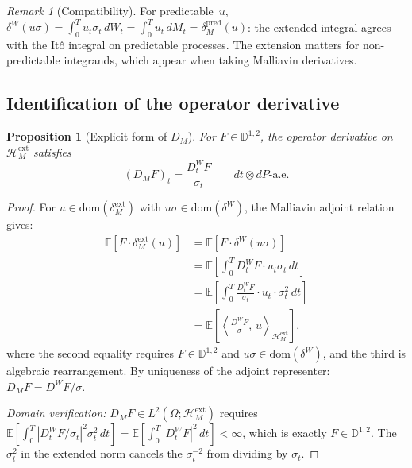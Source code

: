 \documentclass[11pt,a4paper]{article}
\theoremstyle{plain}
\newtheorem{proposition}[theorem]{Proposition}
\theoremstyle{definition}
\theoremstyle{remark}
\newtheorem{remark}[theorem]{Remark}
\newcommand{\E}{\mathbb{E}}
\newcommand{\dom}{\mathrm{dom}}
\newcommand{\HM}{\mathcal{H}_M}
\begin{document}
\begin{remark}[Compatibility]\label{rem:compat}
For predictable~$u$, $\delta^W(u\sigma) = \int_0^T u_t\sigma_t\,dW_t = \int_0^T u_t\,dM_t = \delta_M^{\mathrm{pred}}(u)$: the extended integral agrees with the It\^o integral on predictable processes. The extension matters for non-predictable integrands, which appear when taking Malliavin derivatives.
\end{remark}


\subsection{Identification of the operator derivative}

\begin{proposition}[Explicit form of $D_M$]\label{prop:DM}
For $F \in \mathbb{D}^{1,2}$, the operator derivative on $\HM^{\mathrm{ext}}$ satisfies
\begin{equation}\label{eq:DM}
(D_M F)_t = \frac{D_t^W F}{\sigma_t} \qquad dt \otimes dP\text{-a.e.}
\end{equation}
\end{proposition}

\begin{proof}
For $u \in \dom(\delta_M^{\mathrm{ext}})$ with $u\sigma \in \dom(\delta^W)$, the Malliavin adjoint relation~\cite[Proposition 1.3.1]{Nualart2006} gives:
\begin{align*}
\E[F \cdot \delta_M^{\mathrm{ext}}(u)] &= \E[F \cdot \delta^W(u\sigma)] \\
&= \E\!\left[\int_0^T D_t^W F \cdot u_t \sigma_t\,dt\right] \\
&= \E\!\left[\int_0^T \frac{D_t^W F}{\sigma_t} \cdot u_t \cdot \sigma_t^2\,dt\right] \\
&= \E\!\left[\left\langle \frac{D^W F}{\sigma},\, u \right\rangle_{\HM^{\mathrm{ext}}}\right],
\end{align*}
where the second equality requires $F \in \mathbb{D}^{1,2}$ and $u\sigma \in \dom(\delta^W)$, and the third is algebraic rearrangement. By uniqueness of the adjoint representer: $D_M F = D^W F / \sigma$.

\emph{Domain verification:} $D_M F \in L^2(\Omega; \HM^{\mathrm{ext}})$ requires $\E[\int_0^T |D_t^W F / \sigma_t|^2 \sigma_t^2\,dt] = \E[\int_0^T |D_t^W F|^2\,dt] < \infty$, which is exactly $F \in \mathbb{D}^{1,2}$. The $\sigma_t^2$ in the extended norm cancels the $\sigma_t^{-2}$ from dividing by $\sigma_t$.
\end{proof}
\end{document}
